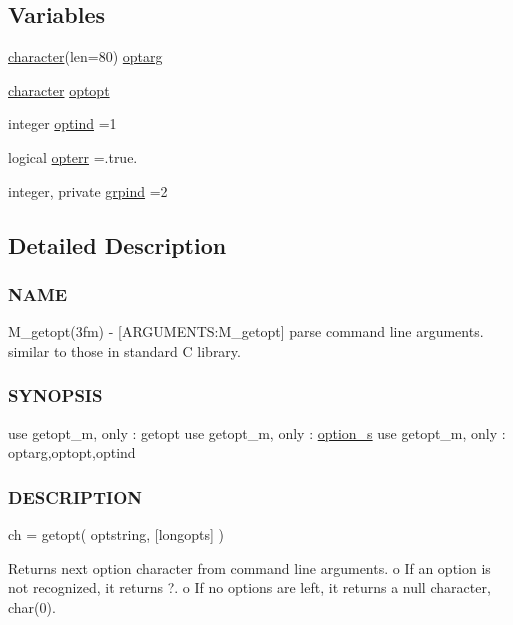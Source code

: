 \subsection*{Variables}
\begin{DoxyCompactItemize}
\item 
\hyperlink{option__stopwatch_83_8txt_abd4b21fbbd175834027b5224bfe97e66}{character}(len=80) \hyperlink{namespacem__getopt_abfaa4b627673956019b3c2148e32a6fa}{optarg}
\item 
\hyperlink{option__stopwatch_83_8txt_abd4b21fbbd175834027b5224bfe97e66}{character} \hyperlink{namespacem__getopt_a66243e462b4a0546b8ab7c8b5c73eb91}{optopt}
\item 
integer \hyperlink{namespacem__getopt_acf82c0ecb5e883455b91a3c8620b50c2}{optind} =1
\item 
logical \hyperlink{namespacem__getopt_a7e1bffca463ec7a33438746eea4f9cf0}{opterr} =.true.
\item 
integer, private \hyperlink{namespacem__getopt_ae80924cbaae8d0e057ab2a0660cddee4}{grpind} =2
\end{DoxyCompactItemize}


\subsection{Detailed Description}
\subsubsection*{N\+A\+ME}

M\+\_\+getopt(3fm) -\/ \mbox{[}A\+R\+G\+U\+M\+E\+N\+TS\+:M\+\_\+getopt\mbox{]} parse command line arguments. similar to those in standard C library. 

\subsubsection*{S\+Y\+N\+O\+P\+S\+IS}

use getopt\+\_\+m, only \+: getopt use getopt\+\_\+m, only \+: \hyperlink{structm__getopt_1_1option__s}{option\+\_\+s} use getopt\+\_\+m, only \+: optarg,optopt,optind

\subsubsection*{D\+E\+S\+C\+R\+I\+P\+T\+I\+ON}

ch = getopt( optstring, \mbox{[}longopts\mbox{]} )

Returns next option character from command line arguments. o If an option is not recognized, it returns \textquotesingle{}?\textquotesingle{}. o If no options are left, it returns a null character, char(0).

